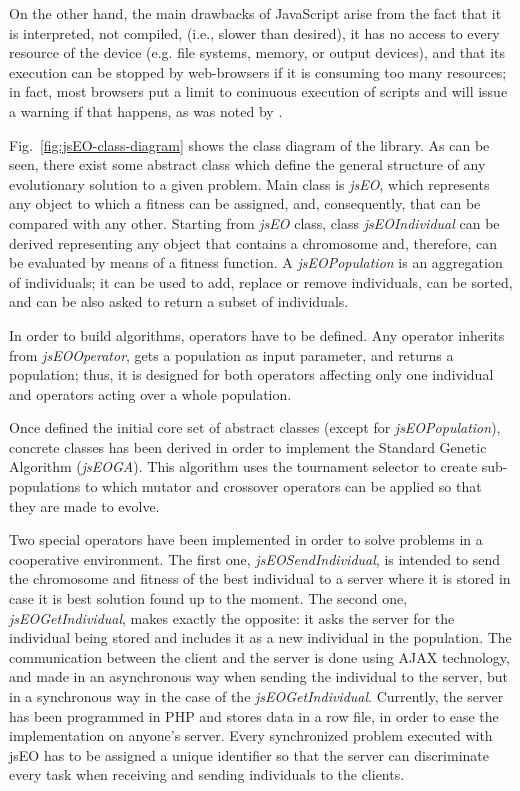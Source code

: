 \documentclass[runningheads,a4paper]{llncs}
\begin{document}
On the other hand, the main drawbacks of JavaScript  arise from the fact that
it is interpreted, not compiled, (i.e., slower than desired), it has
no access to every resource of the device (e.g. file systems,  memory,
or output devices), and that its execution can be stopped by
web-browsers if it is consuming too many resources; in fact, most
browsers put a limit to coninuous execution of scripts and will issue
a warning if that happens, as was noted by
\cite{gecco07:workshop:dcor}. 

Fig.~\ref{fig:jsEO-class-diagram} shows the class diagram of the
library. As can be seen, there exist some abstract class which define
the general structure of any evolutionary solution to a given
problem. Main class is \textit{jsEO}, which represents any object to
which a fitness can be assigned, and, consequently, that can be
compared with any other. Starting from \textit{jsEO} class, class
\textit{jsEOIndividual} can be derived representing any object that
contains a chromosome and, therefore, can be evaluated by means of a
fitness function. A \textit{jsEOPopulation} is an aggregation of
individuals; it can be used to add, replace or remove individuals, can
be sorted, and can be also asked to return a subset of individuals. 

In order to build algorithms, operators have to be defined. Any operator inherits from \textit{jsEOOperator}, gets a population as input parameter, and returns a population; thus, it is designed for both operators affecting only one individual and operators acting over a whole population.

Once defined the initial core set of abstract classes (except for \textit{jsEOPopulation}), concrete classes has been derived in order to implement the Standard Genetic Algorithm (\textit{jsEOGA}). This algorithm uses the tournament selector to create sub-populations to which mutator and crossover operators can be applied so that they are made to evolve.

Two special operators have been implemented in order to solve problems in a cooperative environment. The first one, \textit{jsEOSendIndividual}, is intended to send the chromosome and fitness of the best individual to a server where it is stored in case it is best solution found up to the moment. The second one, \textit{jsEOGetIndividual}, makes exactly the opposite: it asks the server for the individual being stored and includes it as a new individual in the population. The communication between the client and the server is done using AJAX technology, and made in an asynchronous way when sending the individual to the server, but in a synchronous way in the case of the \textit{jsEOGetIndividual}. Currently, the server has been programmed in PHP and stores data in a row file, in order to ease the implementation on anyone's server. Every synchronized problem executed with jsEO has to be assigned a unique identifier so that the server can discriminate every task when receiving and sending individuals to the clients.
\end{document}
